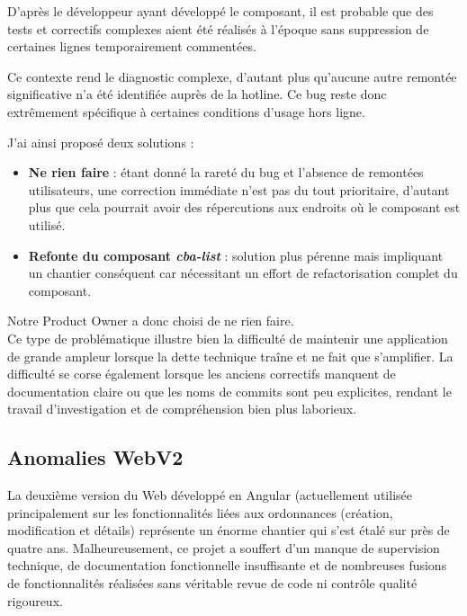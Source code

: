 \documentclass{article}
\begin{document}
D'après le développeur ayant développé le composant, il est probable que des tests et correctifs complexes aient été réalisés à l'époque sans suppression de certaines lignes temporairement commentées.

Ce contexte rend le diagnostic complexe, d'autant plus qu'aucune autre remontée significative n'a été identifiée auprès de la hotline. Ce bug reste donc extrêmement spécifique à certaines conditions d'usage hors ligne.

J'ai ainsi proposé deux solutions :

\begin{itemize}
    \item \textbf{Ne rien faire} : étant donné la rareté du bug et l'absence de remontées utilisateurs, une correction immédiate n'est pas du tout prioritaire, d'autant plus que cela pourrait avoir des répercutions aux endroits où le composant est utilisé.
    \item \textbf{Refonte du composant \textit{cba-list}} : solution plus pérenne mais impliquant un chantier conséquent car nécessitant un effort de refactorisation complet du composant.
\end{itemize}

Notre Product Owner a donc choisi de ne rien faire. \\

Ce type de problématique illustre bien la difficulté de maintenir une application de grande ampleur lorsque la dette technique traîne et ne fait que s'amplifier. La difficulté se corse également lorsque les anciens correctifs manquent de documentation claire ou que les noms de commits sont peu explicites, rendant le travail d'investigation et de compréhension bien plus laborieux.

\subsection{ Anomalies WebV2}

La deuxième version du Web développé en Angular (actuellement utilisée principalement sur les fonctionnalités liées aux ordonnances (création, modification et détails) représente un énorme chantier qui s'est étalé sur près de quatre ans. Malheureusement, ce projet a souffert d'un manque de supervision technique, de documentation fonctionnelle insuffisante et de nombreuses fusions de fonctionnalités réalisées sans véritable revue de code ni contrôle qualité rigoureux. \\
\end{document}
